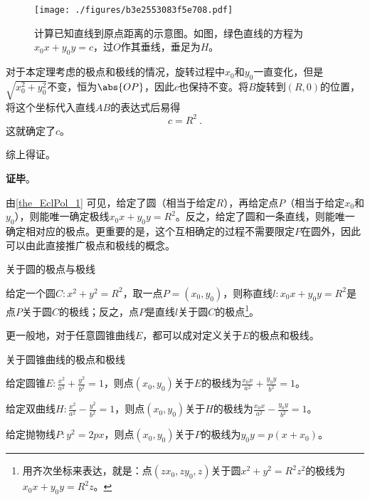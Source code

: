 \begin{figure}[ht]
\centering
\texttt{[image: ./figures/b3e2553083f5e708.pdf]}
\caption{计算已知直线到原点距离的示意图。如图，绿色直线的方程为$x_0x+y_0y=c$，过$O$作其垂线，垂足为$H$。} \label{fig_EclPol_2}
\end{figure}


对于本定理考虑的极点和极线的情况，旋转过程中$x_0$和$y_0$一直变化，但是$\sqrt{x_0^2+y_0^2}$不变，恒为$\abs{OP}$，因此$c$也保持不变。将$B$旋转到$(R, 0)$的位置，将这个坐标代入直线$AB$的表达式后易得
\begin{equation}
c=R^2~. 
\end{equation}
这就确定了$c$。

综上得证。

\textbf{证毕}。



由\autoref{the_EclPol_1} 可见，给定了圆（相当于给定$R$），再给定点$P$（相当于给定$x_0$和$y_0$），则能唯一确定极线$x_0x+y_0y=R^2$。反之，给定了圆和一条直线，则能唯一确定相对应的极点。更重要的是，这个互相确定的过程不需要限定$P$在圆外，因此可以由此直接推广极点和极线的概念。




\begin{definition}{关于圆的极点与极线}\label{def_EclPol_2}

给定一个圆$C: x^2+y^2=R^2$，取一点$P=(x_0, y_0)$，则称直线$l:x_0x+y_0y=R^2$是点$P$关于圆$C$的极线；反之，点$P$是直线$l$关于圆$C$的极点\footnote{用齐次坐标来表达，就是：点$(zx_0, zy_0, z)$关于圆$x^2+y^2=R^2z^2$的极线为$x_0x+y_0y=R^2z$。}。

\end{definition}





更一般地，对于任意圆锥曲线$E$，都可以成对定义关于$E$的极点和极线。



\begin{definition}{关于圆锥曲线的极点和极线}

给定圆锥$E:\frac{x^2}{a^2}+\frac{y^2}{b^2}=1$，则点$(x_0, y_0)$关于$E$的极线为$\frac{x_0x}{a^2}+\frac{y_0y}{b^2}=1$。

给定双曲线$H:\frac{x^2}{a^2}-\frac{y^2}{b^2}=1$，则点$(x_0, y_0)$关于$H$的极线为$\frac{x_0x}{a^2}-\frac{y_0y}{b^2}=1$。

给定抛物线$P:y^2=2px$，则点$(x_0, y_0)$关于$P$的极线为$y_0y=p(x+x_0)$。

\end{definition}




















